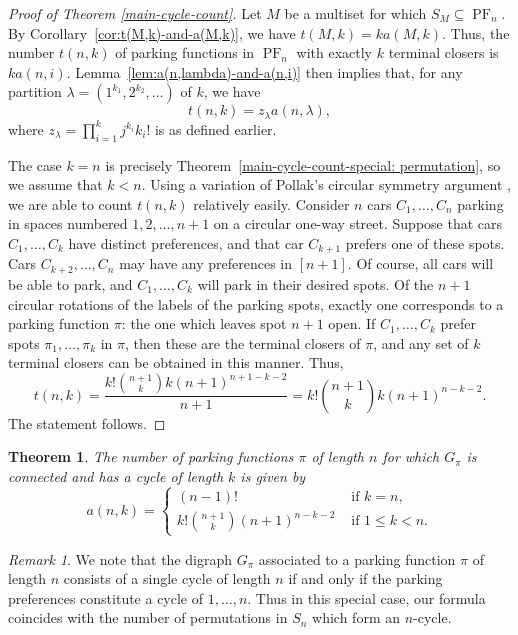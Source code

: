 \documentclass[letterpaper]{amsart}
\theoremstyle{plain}
\newtheorem{theorem}{Theorem}
\theoremstyle{definition}
\theoremstyle{remark}
\newtheorem*{remark}{Remark}
\DeclareMathOperator{\PF}{PF}
\begin{document}
\begin{proof}[Proof of Theorem \ref{main-cycle-count}]
Let $M$ be a multiset for which $S_M \subseteq \PF_n$.
By Corollary~\ref{cor:t(M,k)-and-a(M,k)}, we have $t(M,k) = k a(M,k)$.
Thus, the number $t(n,k)$ of parking functions in $\PF_n$ with exactly $k$ terminal closers is $k a(n,i)$.
Lemma~\ref{lem:a(n,lambda)-and-a(n,i)} then implies that, for any partition $\lambda = (1^{k_1}, 2^{k_2}, \ldots)$ of $k$, we have 
\[
t(n,k) = z_\lambda a(n,\lambda),
\]
where $z_\lambda=\prod_{i=1}^k j^{k_i} k_i!$ is as defined earlier.

The case $k = n$ is precisely Theorem~\ref{main-cycle-count-special: permutation}, so we assume that $k < n$.
Using a variation of Pollak's circular symmetry argument \cite{Foata1974, Riordan1969}, we are able to count $t(n,k)$ relatively easily.
Consider $n$ cars $C_1, \ldots, C_n$ parking in spaces numbered $1, 2, \ldots, n+1$ on a circular one-way street.
Suppose that cars $C_1, \ldots, C_k$ have distinct preferences, and that car $C_{k+1}$ prefers one of these spots.
Cars $C_{k+2}, \ldots, C_n$ may have any preferences in $[n+1]$.
Of course, all cars will be able to park, and $C_1, \ldots, C_k$ will park in their desired spots.
Of the $n+1$ circular rotations of the labels of the parking spots, exactly one corresponds to a parking function $\pi$: the one which leaves spot $n+1$ open.
If $C_1, \ldots, C_k$ prefer spots $\pi_1, \ldots, \pi_k$ in $\pi$, then these are the terminal closers of $\pi$, and any set of $k$ terminal closers can be obtained in this manner.
Thus,
\[
t(n,k) = \frac{k! \binom{n+1}{k} k (n+1)^{n + 1 - k - 2} }{n+1} = k! \binom{n+1}{k} k (n+1)^{n - k - 2}.
\]
The statement follows.
\end{proof}

\begin{theorem}\label{main-cycle-count-special}
The number of parking functions $\pi$ of length $n$ for which $G_\pi$ is connected and has a cycle of length $k$ is given by
\begin{equation*}
a(n, k)=\begin{cases}
(n-1)! & \text{ if } k = n, \\
k! \binom{n+1}{k} (n+1)^{n-k-2} & \text{ if } 1 \leq k < n.
\end{cases}
\end{equation*}
\end{theorem}

\begin{remark}
We note that the digraph $G_{\pi}$ associated to a parking function $\pi$ of length $n$ consists of a single cycle of length $n$ if and only if the parking preferences constitute a cycle of $1, \dots, n$. Thus in this special case, our formula coincides with the number of permutations in $S_n$ which form an $n$-cycle.
\end{remark}
\end{document}
